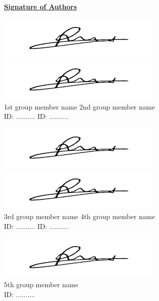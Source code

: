 \begin{flushleft}

\textbf{\underline{Signature of Authors}} \null\hfill  

\vspace{10mm}

\underline{\includegraphics[scale=0.7]{khaled.png}} \null\hfill 
\underline{\includegraphics[scale=0.4]{khaled.png}}\\
1st group member name \null\hfill   2nd group member name \\
ID: ..........  \null\hfill  ID: .......... \\

\vspace{5mm}

\underline{\includegraphics[scale=0.4]{khaled.png}} \null\hfill 
\underline{\includegraphics[scale=0.7]{khaled.png}}\\
3rd group member name  \null\hfill   4th group member name\\
ID: ..........  \null\hfill  ID: ..........\\

\vspace{5mm}

\underline{\includegraphics[scale=0.5]{khaled.png}}\\
5th group member name\\
ID: .......... \\ 
\end{flushleft}